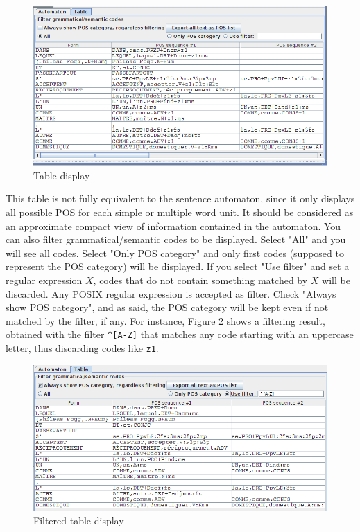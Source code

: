 \begin{figure}[!ht]
\begin{center}
\includegraphics[width=14.5cm]{resources/img/fig7-table1.png}
\caption{Table display\label{fig7-table1}}
\end{center}
\end{figure}

\bigskip
\noindent This table is not fully equivalent to the sentence automaton, since it only
displays all possible POS for each simple or multiple word unit. It should be considered
as an approximate compact view of information contained in the automaton. You can also filter
grammatical/semantic codes to be displayed. Select "All" and you will see all codes. Select
"Only POS category" and only first codes (supposed to represent the POS category) will be displayed.
If you select "Use filter" and set a regular expression $X$, codes that do not contain something 
matched by $X$ will be discarded. Any POSIX regular expression is accepted as filter. Check 
"Always show POS category", and as said, the POS category will be kept even if not matched by the filter,
if any. For instance, Figure \ref{fig7-table2} shows a filtering result, obtained with the filter
\verb+^[A-Z]+ that matches any code starting with an uppercase letter, thus discarding codes like
\verb+z1+.

\begin{figure}[!ht]
\begin{center}
\includegraphics[width=14.5cm]{resources/img/fig7-table2.png}
\caption{Filtered table display\label{fig7-table2}}
\end{center}
\end{figure}
      
